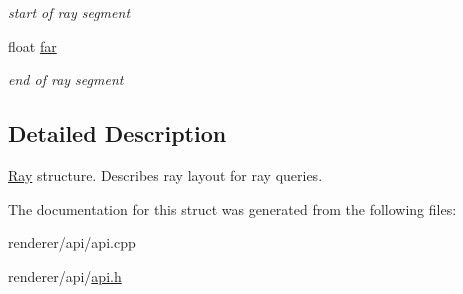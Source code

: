 \begin{DoxyCompactItemize}
\begin{DoxyCompactList}\small\item\em start of ray segment \item\end{DoxyCompactList}\item 
\hypertarget{structembree_1_1_r_t_ray_afcd10fcadabc0a6c7bf7691b306e5fcf}{
float \hyperlink{structembree_1_1_r_t_ray_afcd10fcadabc0a6c7bf7691b306e5fcf}{far}}
\label{structembree_1_1_r_t_ray_afcd10fcadabc0a6c7bf7691b306e5fcf}

\begin{DoxyCompactList}\small\item\em end of ray segment \item\end{DoxyCompactList}\end{DoxyCompactItemize}


\subsection{Detailed Description}
\hyperlink{structembree_1_1_ray}{Ray} structure. Describes ray layout for ray queries. 

The documentation for this struct was generated from the following files:\begin{DoxyCompactItemize}
\item 
renderer/api/api.cpp\item 
renderer/api/\hyperlink{api_8h}{api.h}\end{DoxyCompactItemize}
